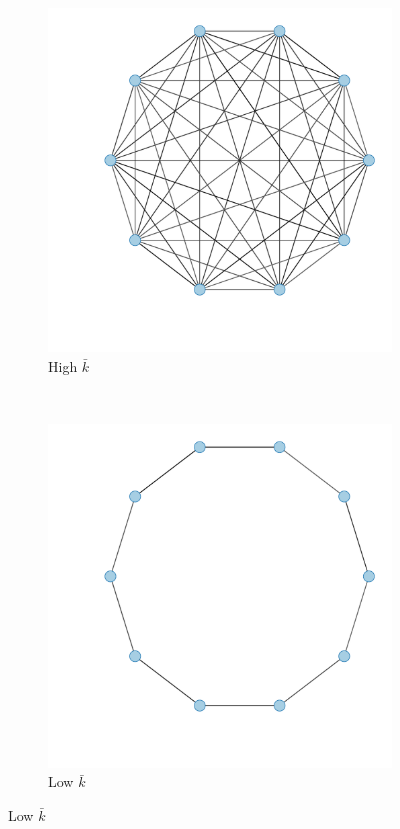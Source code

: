 \begin{figure}[b]
\centering
        \begin{subfigure}[b]{0.35\textwidth}
                \centering
		\includegraphics[width=1\textwidth]{imgs/fullyConnected.pdf}
                \caption{High $\bar{k}$}
                \label{fig:fullyConnected}
        \end{subfigure}
        ~ 
	\begin{subfigure}[b]{0.35\textwidth}
                \centering
		\includegraphics[width=1\textwidth]{imgs/minimallyConnected.pdf}
                \caption{Low $\bar{k}$}
                \label{fig:minimallyConnected}
        \end{subfigure}%


\end{figure}
